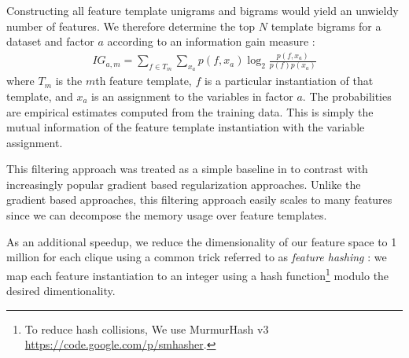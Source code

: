 \documentclass[11pt]{article}
\begin{document}
Constructing all feature template unigrams and bigrams would yield an
unwieldy number of features.
We therefore determine the top $N$ template bigrams for a dataset and 
factor $a$ according to an
information gain measure \cite{martins_structured_2011}:
\begin{align*}
  IG_{a,m} = \sum_{f \in T_m} \sum_{x_a} p(f, x_a) \log_2 \frac{p(f, x_a)}{p(f) p(x_a)}
  \label{eq:informationGain}  
\end{align*}
where $T_m$ is the $m$th feature template, $f$ is a particular
instantiation of that template, and $x_a$ is an assignment to the
variables in factor $a$. The probabilities are empirical
estimates computed from the training data. This is simply the mutual
information of the feature template instantiation with the variable assignment.

This filtering approach was treated as a simple baseline in
 to contrast with increasingly
popular gradient based regularization approaches. Unlike the gradient
based approaches, this filtering approach easily scales to many
features since we can decompose the memory usage over feature
templates.  

As an additional speedup, we reduce the dimensionality of our feature space to 1
million for each clique using a common trick referred to as
\emph{feature hashing} \cite{weinberger_feature_2009}: we map each feature
instantiation to an integer using a hash function\footnote{To
  reduce hash collisions, We use MurmurHash v3
  \url{https://code.google.com/p/smhasher}.} modulo the desired dimentionality.
\end{document}
